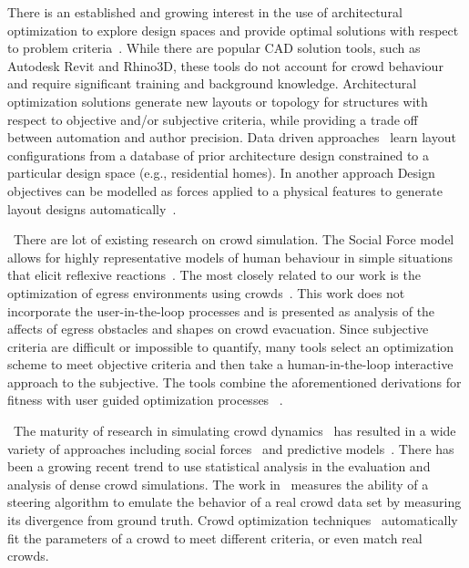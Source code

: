 There is an established and growing interest in the use of architectural optimization to explore design spaces and provide optimal solutions with respect to problem criteria~\cite{block2014advances,pottmann2014architectural}. While there are popular CAD solution tools, such as Autodesk Revit and Rhino3D, these tools do not account for crowd behaviour and require significant training and background knowledge. Architectural optimization solutions generate new layouts or topology for structures with respect to objective and/or subjective criteria, while providing a trade off between automation and author precision.  Data driven approaches~\cite{Merrell:2010:CRB:1882261.1866203} learn layout configurations from a database of prior architecture design constrained to a particular design space (e.g., residential homes). In another approach Design objectives can be modelled as forces applied to a physical features to generate layout designs automatically~\cite{arvin2002modeling}.

~There are lot of existing research on crowd simulation. The Social Force model allows for highly representative models of human behaviour in simple situations that elicit reflexive reactions~\cite{PhysRevE.51.4282}. The most closely related to our work is the optimization of egress environments using crowds~\cite{johansson2007pedestrian,jiang2014obstacle}. This work does not incorporate the user-in-the-loop processes and is presented as analysis of the affects of egress obstacles and shapes on crowd evacuation. Since subjective criteria are difficult or impossible to quantify, many tools select an optimization scheme to meet objective criteria and then take a human-in-the-loop interactive approach to the subjective. The tools combine the aforementioned derivations for fitness with user guided optimization processes ~\cite{shi2013performance,turrin2011design,Michalek02interactivedesign}. 

~The maturity of research in simulating crowd dynamics~\cite{badlerBook,DBLP:books/daglib/0030710} has resulted in a wide variety of approaches including social forces~\cite{helbing2000simulating} and predictive models~\cite{ORCA,ppr}. There has been a growing recent trend to use statistical analysis in the evaluation and analysis of dense crowd simulations.  The work in~\cite{guy2012statistical,Pettre:2009:EMS:1599470.1599495} measures the ability of a steering algorithm to emulate the behavior of a real crowd data set by measuring its divergence from ground truth.  Crowd optimization techniques~\cite{paramFitting,sca.20141129} automatically fit the parameters of a crowd to meet different criteria, or even match real crowds. 

